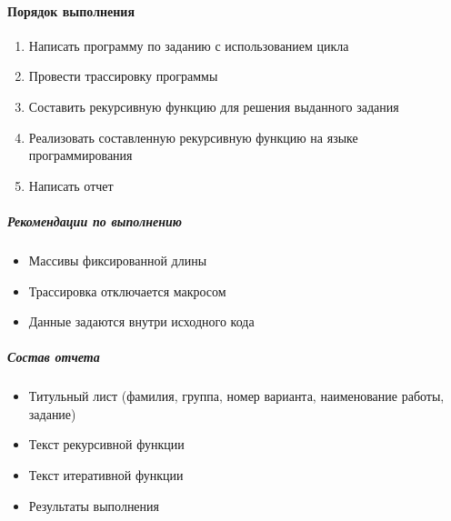 \documentclass[a4paper,12pt]{article}
\begin{document}
\paragraph{Порядок выполнения}
\begin{enumerate}
	\item Написать программу по заданию с использованием цикла
	\item Провести трассировку программы
	\item Составить рекурсивную функцию для решения выданного задания
	\item Реализовать составленную рекурсивную функцию на языке программирования
	\item Написать отчет
\end{enumerate}

\subparagraph{Рекомендации по выполнению}
\begin{itemize}
	\item Массивы фиксированной длины
	\item Трассировка отключается макросом
	\item Данные задаются внутри исходного кода
\end{itemize}

\subparagraph{Состав отчета}
\begin{itemize}
	\item Титульный лист (фамилия, группа, номер варианта, наименование работы, задание)
	\item Текст рекурсивной функции
	\item Текст итеративной функции
	\item Результаты выполнения
\end{itemize}
\end{document}
